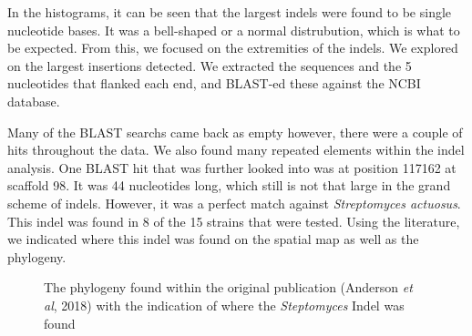  
In the histograms, it can be seen that the largest indels were found to be single nucleotide bases. It was a bell-shaped or a normal distrubution, which is what to be expected. From this, we focused on the extremities of the indels. We explored on the largest insertions detected. We extracted the sequences and the 5 nucleotides that flanked each end, and BLAST-ed these against the NCBI database.  

Many of the BLAST searchs came back as empty however, there were a couple of hits throughout the data. We also found many repeated elements within the indel analysis. One BLAST hit that was further looked into was at position 117162 at scaffold 98. It was 44 nucleotides long, which still is not that large in the grand scheme of indels. However, it was a perfect match against \textit{Streptomyces actuosus}. This indel was found in 8 of the 15 strains that were tested. Using the literature, we indicated where this indel was found on the spatial map as well as the phylogeny.
 
 
\begin{figure}[H]
	\begin{centering}
		\vspace{1.5cm}
		\begin{singlespace}
			\vspace{-0.5cm}
			\caption[Phylogeny overlap with \textit{Streptomyces} Indels]{The phylogeny found within the original publication (Anderson \textit{et al}, 2018) with the indication of where the \textit{Steptomyces} Indel was found}\label{tree1}
		\end{singlespace}
	\end{centering}
\end{figure}

